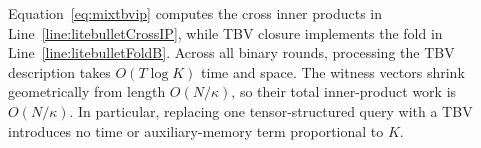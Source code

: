 Equation~\eqref{eq:mixtbvip} computes the cross inner products in
Line~\ref{line:litebulletCrossIP}, while TBV closure implements the fold in
Line~\ref{line:litebulletFoldB}.  Across all binary rounds, processing the TBV
description takes $O(T\log K)$ time and space.  The witness vectors shrink
geometrically from length $O(N/\kappa)$, so their total inner-product work is
$O(N/\kappa)$.  In particular, replacing one tensor-structured query with a
TBV introduces no time or auxiliary-memory term proportional to $K$.
